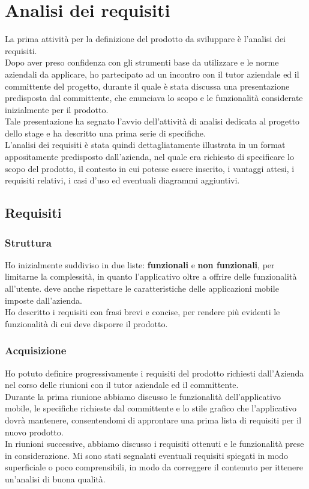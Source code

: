 \newpage
\chapter{Analisi dei requisiti}
\label{cap:analisi-requisiti}
La prima attività per la definizione del prodotto da sviluppare è l'analisi dei requisiti. \\
Dopo aver preso confidenza con gli strumenti base da utilizzare e le norme aziendali da applicare, ho partecipato ad un incontro con il tutor aziendale ed il committente del progetto, durante il quale è stata discussa una presentazione predisposta dal committente, che enunciava lo scopo e le funzionalità considerate inizialmente per il prodotto. \\
Tale presentazione ha segnato l'avvio dell'attività di analisi dedicata al progetto dello stage e ha descritto una prima serie di specifiche. \\
L'analisi dei requisiti è stata quindi dettagliatamente illustrata in un format appositamente predisposto dall'azienda, nel quale era richiesto di specificare lo scopo del prodotto, il contesto in cui potesse essere inserito, i vantaggi attesi, i requisiti relativi, i casi d'uso ed eventuali diagrammi aggiuntivi.
\section{Requisiti}
\subsection{Struttura}
Ho inizialmente suddiviso in due liste: \textbf{funzionali} e \textbf{non funzionali}, per limitarne la complessità, in quanto l'applicativo oltre a offrire delle funzionalità all'utente. deve anche rispettare le caratteristiche delle applicazioni mobile imposte dall'azienda. \\
Ho descritto i requisiti con frasi brevi e concise, per rendere più evidenti le funzionalità di cui deve disporre il prodotto. \\
\subsection{Acquisizione}
Ho potuto definire progressivamente i requisiti del prodotto richiesti dall'Azienda nel corso delle riunioni con il tutor aziendale ed il committente. \\
Durante la prima riunione abbiamo discusso le funzionalità dell'applicativo mobile, le specifiche richieste dal committente e lo stile grafico che l'applicativo dovrà mantenere, consentendomi di approntare una prima lista di requisiti per il nuovo prodotto. \\
In riunioni successive, abbiamo discusso i requisiti ottenuti e le funzionalità prese in considerazione. Mi sono stati segnalati eventuali requisiti spiegati in modo superficiale o poco comprensibili, in modo da correggere il contenuto per ittenere un'analisi di buona qualità.
